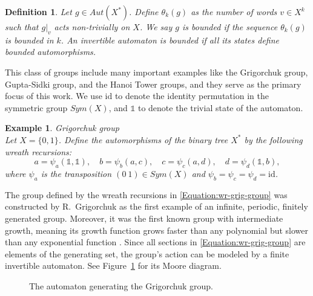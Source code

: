 \documentclass{article}
\newtheorem{myexa}{Example}[section]
\newtheorem{mydef}{Definition}[section]
\newcommand{\id}{\mathds{1}}
\newcommand{\idperm}{\mathrm{id}}
\begin{document}
\begin{mydef}
    Let $g \in Aut(X^*)$. Define $\theta_k(g)$ as the number of words $v \in X^k$ such that $g|_v$ acts non-trivially on $X$. We say $g$ is \emph{bounded} if the sequence $\theta_k(g)$ is bounded in $k$. An invertible automaton is \emph{bounded} if all its states define bounded automorphisms.
\end{mydef}

This class of groups include many important examples like the Grigorchuk group, Gupta-Sidki group, and the Hanoi Tower groups, and they serve as the primary focus of this work. We use $\idperm$ to denote the identity permutation in the symmetric group $Sym(X)$, and $\id$ to denote the trivial state of the automaton.

 \begin{myexa}Grigorchuk group \label{grig-group-ex} \\
	Let $X = \{0,1\}$. Define the automorphisms of the binary tree $X^*$ by the following wreath recursions:
\begin{equation}
\label{Equation:wr-grig-group}
a = \psi_a(\id,\id),\quad b = \psi_b (a, c),\quad c = \psi_c (a, d),\quad d = \psi_d (\id, b),
\end{equation}
where $\psi_a$ is the transposition $(0~1) \in Sym(X)$ and $\psi_b = \psi_c = \psi_d = \idperm$. 
 \end{myexa}   
    The group defined by the wreath recursions in \eqref{Equation:wr-grig-group} was constructed by R.~Grigorchuk as the first example of an infinite, periodic, finitely generated group. Moreover, it was the first known group with intermediate growth, meaning its growth function grows faster than any polynomial but slower than any exponential function \cite{grigorchuk1980burnside}. Since all sections in \eqref{Equation:wr-grig-group} are elements of the generating set, the group's action can be modeled by a finite invertible automaton. See Figure~\ref{Figure:auto_grig} for its Moore diagram.
\begin{figure}[!htb]
	\centering
	\caption{The automaton generating the Grigorchuk group.}
	\label{Figure:auto_grig}
\end{figure}
\end{document}
